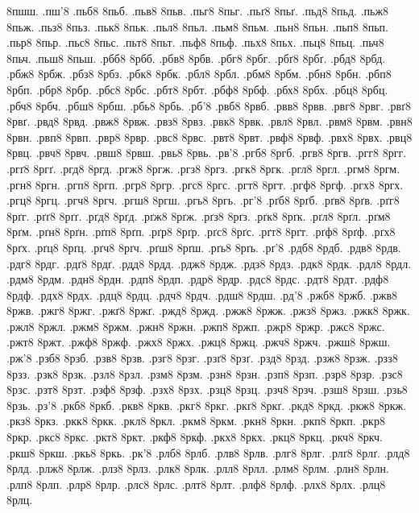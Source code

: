 {8пшш.
.пш'8
.пьб8
8пьб.
.пьв8
8пьв.
.пьг8
8пьг.
.пьґ8
8пьґ.
.пьд8
8пьд.
.пьж8
8пьж.
.пьз8
8пьз.
.пьк8
8пьк.
.пьл8
8пьл.
.пьм8
8пьм.
.пьн8
8пьн.
.пьп8
8пьп.
.пьр8
8пьр.
.пьс8
8пьс.
.пьт8
8пьт.
.пьф8
8пьф.
.пьх8
8пьх.
.пьц8
8пьц.
.пьч8
8пьч.
.пьш8
8пьш.
.рбб8
8рбб.
.рбв8
8рбв.
.рбг8
8рбг.
.рбґ8
8рбґ.
.рбд8
8рбд.
.рбж8
8рбж.
.рбз8
8рбз.
.рбк8
8рбк.
.рбл8
8рбл.
.рбм8
8рбм.
.рбн8
8рбн.
.рбп8
8рбп.
.рбр8
8рбр.
.рбс8
8рбс.
.рбт8
8рбт.
.рбф8
8рбф.
.рбх8
8рбх.
.рбц8
8рбц.
.рбч8
8рбч.
.рбш8
8рбш.
.рбь8
8рбь.
.рб'8
.рвб8
8рвб.
.рвв8
8рвв.
.рвг8
8рвг.
.рвґ8
8рвґ.
.рвд8
8рвд.
.рвж8
8рвж.
.рвз8
8рвз.
.рвк8
8рвк.
.рвл8
8рвл.
.рвм8
8рвм.
.рвн8
8рвн.
.рвп8
8рвп.
.рвр8
8рвр.
.рвс8
8рвс.
.рвт8
8рвт.
.рвф8
8рвф.
.рвх8
8рвх.
.рвц8
8рвц.
.рвч8
8рвч.
.рвш8
8рвш.
.рвь8
8рвь.
.рв'8
.ргб8
8ргб.
.ргв8
8ргв.
.ргг8
8ргг.
.ргґ8
8ргґ.
.ргд8
8ргд.
.ргж8
8ргж.
.ргз8
8ргз.
.ргк8
8ргк.
.ргл8
8ргл.
.ргм8
8ргм.
.ргн8
8ргн.
.ргп8
8ргп.
.ргр8
8ргр.
.ргс8
8ргс.
.ргт8
8ргт.
.ргф8
8ргф.
.ргх8
8ргх.
.ргц8
8ргц.
.ргч8
8ргч.
.ргш8
8ргш.
.ргь8
8ргь.
.рг'8
.рґб8
8рґб.
.рґв8
8рґв.
.рґг8
8рґг.
.рґґ8
8рґґ.
.рґд8
8рґд.
.рґж8
8рґж.
.рґз8
8рґз.
.рґк8
8рґк.
.рґл8
8рґл.
.рґм8
8рґм.
.рґн8
8рґн.
.рґп8
8рґп.
.рґр8
8рґр.
.рґс8
8рґс.
.рґт8
8рґт.
.рґф8
8рґф.
.рґх8
8рґх.
.рґц8
8рґц.
.рґч8
8рґч.
.рґш8
8рґш.
.рґь8
8рґь.
.рґ'8
.рдб8
8рдб.
.рдв8
8рдв.
.рдг8
8рдг.
.рдґ8
8рдґ.
.рдд8
8рдд.
.рдж8
8рдж.
.рдз8
8рдз.
.рдк8
8рдк.
.рдл8
8рдл.
.рдм8
8рдм.
.рдн8
8рдн.
.рдп8
8рдп.
.рдр8
8рдр.
.рдс8
8рдс.
.рдт8
8рдт.
.рдф8
8рдф.
.рдх8
8рдх.
.рдц8
8рдц.
.рдч8
8рдч.
.рдш8
8рдш.
.рд'8
.ржб8
8ржб.
.ржв8
8ржв.
.ржг8
8ржг.
.ржґ8
8ржґ.
.ржд8
8ржд.
.ржж8
8ржж.
.ржз8
8ржз.
.ржк8
8ржк.
.ржл8
8ржл.
.ржм8
8ржм.
.ржн8
8ржн.
.ржп8
8ржп.
.ржр8
8ржр.
.ржс8
8ржс.
.ржт8
8ржт.
.ржф8
8ржф.
.ржх8
8ржх.
.ржц8
8ржц.
.ржч8
8ржч.
.ржш8
8ржш.
.рж'8
.рзб8
8рзб.
.рзв8
8рзв.
.рзг8
8рзг.
.рзґ8
8рзґ.
.рзд8
8рзд.
.рзж8
8рзж.
.рзз8
8рзз.
.рзк8
8рзк.
.рзл8
8рзл.
.рзм8
8рзм.
.рзн8
8рзн.
.рзп8
8рзп.
.рзр8
8рзр.
.рзс8
8рзс.
.рзт8
8рзт.
.рзф8
8рзф.
.рзх8
8рзх.
.рзц8
8рзц.
.рзч8
8рзч.
.рзш8
8рзш.
.рзь8
8рзь.
.рз'8
.ркб8
8ркб.
.ркв8
8ркв.
.ркг8
8ркг.
.ркґ8
8ркґ.
.ркд8
8ркд.
.ркж8
8ркж.
.ркз8
8ркз.
.ркк8
8ркк.
.ркл8
8ркл.
.ркм8
8ркм.
.ркн8
8ркн.
.ркп8
8ркп.
.ркр8
8ркр.
.ркс8
8ркс.
.ркт8
8ркт.
.ркф8
8ркф.
.ркх8
8ркх.
.ркц8
8ркц.
.ркч8
8ркч.
.ркш8
8ркш.
.ркь8
8ркь.
.рк'8
.рлб8
8рлб.
.рлв8
8рлв.
.рлг8
8рлг.
.рлґ8
8рлґ.
.рлд8
8рлд.
.рлж8
8рлж.
.рлз8
8рлз.
.рлк8
8рлк.
.рлл8
8рлл.
.рлм8
8рлм.
.рлн8
8рлн.
.рлп8
8рлп.
.рлр8
8рлр.
.рлс8
8рлс.
.рлт8
8рлт.
.рлф8
8рлф.
.рлх8
8рлх.
.рлц8
8рлц.
}
